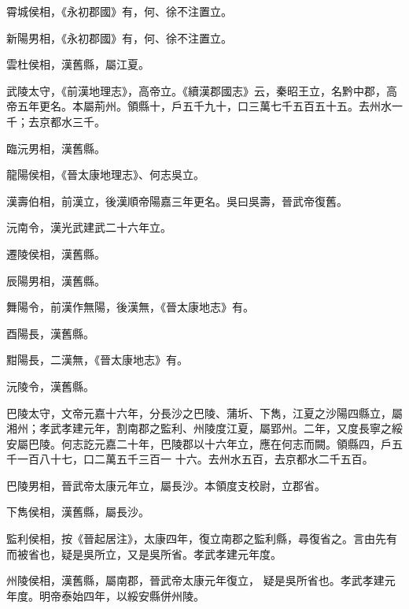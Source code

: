 \begin{pinyinscope}
 霄城侯相，《永初郡國》有，何、徐不注置立。



 新陽男相，《永初郡國》有，何、徐不注置立。



 雲杜侯相，漢舊縣，屬江夏。



 武陵太守，《前漢地理志》，高帝立。《續漢郡國志》云，秦昭王立，名黔中郡，高帝五年更名。本屬荊州。領縣十，戶五千九十，口三萬七千五百五十五。去州水一千；去京都水三千。



 臨沅男相，漢舊縣。



 龍陽侯相，《晉太康地理志》、何志吳立。



 漢壽伯相，前漢立，後漢順帝陽嘉三年更名。吳曰吳壽，晉武帝復舊。



 沅南令，漢光武建武二十六年立。



 遷陵侯相，漢舊縣。



 辰陽男相，漢舊縣。



 舞陽令，前漢作無陽，後漢無，《晉太康地志》有。



 酉陽長，漢舊縣。



 黚陽長，二漢無，《晉太康地志》有。



 沅陵令，漢舊縣。



 巴陵太守，文帝元嘉十六年，分長沙之巴陵、蒲圻、下雋，江夏之沙陽四縣立，屬湘州；孝武孝建元年，割南郡之監利、州陵度江夏，屬郢州。二年，又度長寧之綏安屬巴陵。何志訖元嘉二十年，巴陵郡以十六年立，應在何志而闕。領縣四，戶五千一百八十七，口二萬五千三百一
 十六。去州水五百，去京都水二千五百。



 巴陵男相，晉武帝太康元年立，屬長沙。本領度支校尉，立郡省。



 下雋侯相，漢舊縣，屬長沙。



 監利侯相，按《晉起居注》，太康四年，復立南郡之監利縣，尋復省之。言由先有而被省也，疑是吳所立，又是吳所省。孝武孝建元年度。



 州陵侯相，漢舊縣，屬南郡，晉武帝太康元年復立，
 疑是吳所省也。孝武孝建元年度。明帝泰始四年，以綏安縣併州陵。




\end{pinyinscope}
